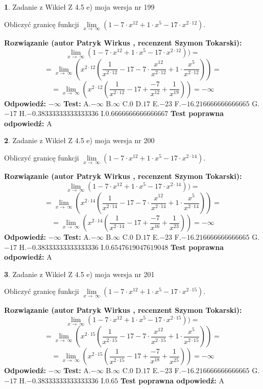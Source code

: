 \documentclass[12pt, a4paper]{article}
\theoremstyle{definition} %
\newtheorem{zad}{}
\newcommand{\zadStart}[1]{\begin{zad}#1\newline}
\newcommand{\zadStop}{\end{zad}}
\newcommand{\rozwStart}[2]{\noindent \textbf{Rozwiązanie (autor #1 , recenzent #2): }\newline}
\newcommand{\rozwStop}{\newline}
\newcommand{\odpStart}{\noindent \textbf{Odpowiedź:}\newline}
\newcommand{\odpStop}{\newline}
\newcommand{\testStart}{\noindent \textbf{Test:}\newline}
\newcommand{\testStop}{\newline}
\newcommand{\kluczStart}{\noindent \textbf{Test poprawna odpowiedź:}\newline}
\newcommand{\kluczStop}{\newline}
\begin{document}
\zadStart{Zadanie z Wikieł Z 4.5 e) moja wersja nr 199}


Obliczyć granicę funkcji  $\lim\limits_{x\to\ \infty}(1 - 7 \cdot x^{12}+1 \cdot x^{5}- 17 \cdot x^{2\cdot12})$.
\zadStop
\rozwStart{Patryk Wirkus}{Szymon Tokarski}
$$\lim\limits_{x\to\ \infty}(1 - 7 \cdot x^{12}+1 \cdot x^{5}- 17 \cdot x^{2\cdot12}))=$$
$$=\lim\limits_{x\to\ \infty}(x^{2\cdot12}(\frac{1}{x^{2\cdot12}}-17 -7 \cdot \frac{x^{12}}{x^{2\cdot12}}+1 \cdot \frac{x^{5}}{x^{2\cdot12}}))=$$
$$=\lim\limits_{x\to\ \infty}(x^{2\cdot12}(\frac{1}{x^{2\cdot12}}-17 + \frac{-7}{x^{12}}+ \frac{1}{x^{19}}))=-\infty$$
\rozwStop
\odpStart
$-\infty$
\odpStop
\testStart
A.$-\infty$ B.$\infty$ C.$0$ D.$17$ E.$-23$
F.$-16.216666666666665$ G.$-17$
H.$-0.38333333333333336$
I.$0.6666666666666667$
\testStop
\kluczStart
A
\kluczStop



\zadStart{Zadanie z Wikieł Z 4.5 e) moja wersja nr 200}


Obliczyć granicę funkcji  $\lim\limits_{x\to\ \infty}(1 - 7 \cdot x^{12}+1 \cdot x^{5}- 17 \cdot x^{2\cdot14})$.
\zadStop
\rozwStart{Patryk Wirkus}{Szymon Tokarski}
$$\lim\limits_{x\to\ \infty}(1 - 7 \cdot x^{12}+1 \cdot x^{5}- 17 \cdot x^{2\cdot14}))=$$
$$=\lim\limits_{x\to\ \infty}(x^{2\cdot14}(\frac{1}{x^{2\cdot14}}-17 -7 \cdot \frac{x^{12}}{x^{2\cdot14}}+1 \cdot \frac{x^{5}}{x^{2\cdot14}}))=$$
$$=\lim\limits_{x\to\ \infty}(x^{2\cdot14}(\frac{1}{x^{2\cdot14}}-17 + \frac{-7}{x^{16}}+ \frac{1}{x^{23}}))=-\infty$$
\rozwStop
\odpStart
$-\infty$
\odpStop
\testStart
A.$-\infty$ B.$\infty$ C.$0$ D.$17$ E.$-23$
F.$-16.216666666666665$ G.$-17$
H.$-0.38333333333333336$
I.$0.6547619047619048$
\testStop
\kluczStart
A
\kluczStop



\zadStart{Zadanie z Wikieł Z 4.5 e) moja wersja nr 201}


Obliczyć granicę funkcji  $\lim\limits_{x\to\ \infty}(1 - 7 \cdot x^{12}+1 \cdot x^{5}- 17 \cdot x^{2\cdot15})$.
\zadStop
\rozwStart{Patryk Wirkus}{Szymon Tokarski}
$$\lim\limits_{x\to\ \infty}(1 - 7 \cdot x^{12}+1 \cdot x^{5}- 17 \cdot x^{2\cdot15}))=$$
$$=\lim\limits_{x\to\ \infty}(x^{2\cdot15}(\frac{1}{x^{2\cdot15}}-17 -7 \cdot \frac{x^{12}}{x^{2\cdot15}}+1 \cdot \frac{x^{5}}{x^{2\cdot15}}))=$$
$$=\lim\limits_{x\to\ \infty}(x^{2\cdot15}(\frac{1}{x^{2\cdot15}}-17 + \frac{-7}{x^{18}}+ \frac{1}{x^{25}}))=-\infty$$
\rozwStop
\odpStart
$-\infty$
\odpStop
\testStart
A.$-\infty$ B.$\infty$ C.$0$ D.$17$ E.$-23$
F.$-16.216666666666665$ G.$-17$
H.$-0.38333333333333336$
I.$0.65$
\testStop
\kluczStart
A
\kluczStop
\end{document}
